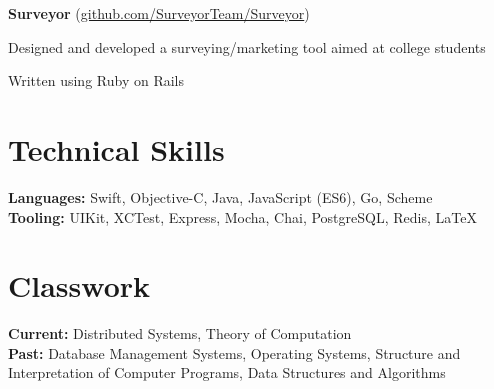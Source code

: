 \documentclass[11pt, a4paper]{article}
\newcommand{\note}[1]{\marginnote{\scriptsize #1}}
\renewenvironment{itemize}[1]{\begin{compactitem}#1}{\end{compactitem}}
\begin{document}
\note{Spring 2015}
\textbf{Surveyor} (\href{https://github.com/surveyorteam/surveyor}{github.com/SurveyorTeam/Surveyor})
\begin{itemize}
    \item Designed and developed a surveying/marketing tool aimed at college students
    \item Written using Ruby on Rails

\end{itemize}

\section*{Technical Skills}
\textbf{Languages:} Swift, Objective-C, Java, JavaScript (ES6), Go, Scheme\\
\textbf{Tooling:} UIKit, XCTest, Express, Mocha, Chai, PostgreSQL, Redis, \LaTeX

\section*{Classwork}
\textbf{Current:} Distributed Systems, Theory of Computation\\
\textbf{Past:} Database Management Systems, Operating Systems, Structure and Interpretation of Computer Programs, Data Structures and Algorithms
\end{document}
